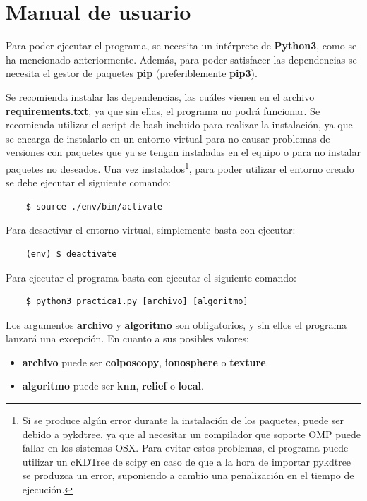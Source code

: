 \documentclass[11pt,a4paper]{article}
\begin{document}
\newpage

\section{Manual de usuario}

Para poder ejecutar el programa, se necesita un intérprete de \textbf{Python3}, como se ha mencionado anteriormente. Además,
para poder satisfacer las dependencias se necesita el gestor de paquetes \textbf{pip} (preferiblemente \textbf{pip3}).

Se recomienda instalar las dependencias, las cuáles vienen en el archivo \textbf{requirements.txt}, ya que sin ellas, el
programa no podrá funcionar. Se recomienda utilizar el script de bash incluido para realizar la instalación, ya que se
encarga de instalarlo en un entorno virtual para no causar problemas de versiones con paquetes que ya se tengan instaladas en
el equipo o para no instalar paquetes no deseados. Una vez instalados\footnote{Si se produce algún error durante la
instalación de los paquetes, puede ser debido a pykdtree, ya que al necesitar un compilador que soporte OMP puede fallar en
los sistemas OSX. Para evitar estos problemas, el programa puede utilizar un cKDTree de scipy en caso de que a la hora de
importar pykdtree se produzca un error, suponiendo a cambio una penalización en el tiempo de ejecución.}, para poder utilizar
el entorno creado se debe ejecutar el siguiente comando:

\begin{lstlisting}
	$ source ./env/bin/activate
\end{lstlisting}

Para desactivar el entorno virtual, simplemente basta con ejecutar:

\begin{lstlisting}
	(env) $ deactivate
\end{lstlisting}

Para ejecutar el programa basta con ejecutar el siguiente comando:

\begin{lstlisting}
	$ python3 practica1.py [archivo] [algoritmo]
\end{lstlisting}

Los argumentos \textbf{archivo} y \textbf{algoritmo} son obligatorios, y sin ellos el programa lanzará una excepción. En
cuanto a sus posibles valores:

\begin{itemize}[label=\textbullet]
	\item \textbf{archivo} puede ser \textbf{colposcopy}, \textbf{ionosphere} o \textbf{texture}.
	\item \textbf{algoritmo} puede ser \textbf{knn}, \textbf{relief} o \textbf{local}.
\end{itemize}
\end{document}
